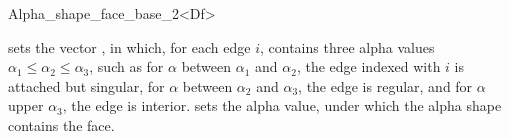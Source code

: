 \begin{ccRefClass}{Alpha_shape_face_base_2<Df>}
\ccModifiers

\begin{ccAdvanced}

{sets the vector , in which, for each edge $i$,  contains three
alpha values
 $\alpha_1 \leq \alpha_2 \leq \alpha_3$, such as for
$\alpha$  between $\alpha_1$ and $\alpha_2$, the edge indexed with $i$ is
attached but singular, 
for $\alpha$ between $\alpha_2$ and $\alpha_3$, the edge is regular, and for $\alpha$
upper $\alpha_3$, the edge is interior.}
{sets the alpha value, under which the alpha shape contains the
face.}

\end{ccAdvanced}

\end{ccRefClass}
